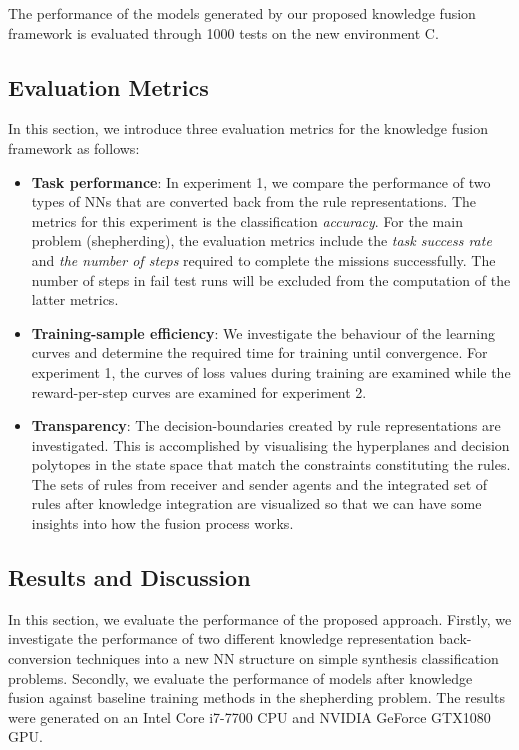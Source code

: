 \documentclass[lettersize,journal]{IEEEtran}
\begin{document}
The performance of the models generated by our proposed knowledge fusion framework is evaluated through 1000 tests on the new environment C.


\subsection{Evaluation Metrics}

In this section, we introduce three evaluation metrics for the knowledge fusion framework as follows:

\begin{itemize}
    \item \textbf{Task performance}: In experiment 1, we compare the performance of two types of NNs that are converted back from the rule representations. The metrics for this experiment is the classification \textit{accuracy}. For the main problem (shepherding), the evaluation metrics include the \textit{task success rate} and \textit{the number of steps} required to complete the missions successfully. The number of steps in fail test runs will be excluded from the computation of the latter metrics. 
    \item \textbf{Training-sample efficiency}: We investigate the behaviour of the learning curves and determine the required time for training until convergence. For experiment 1, the curves of loss values during training are examined while the reward-per-step curves are examined for experiment 2.
    \item \textbf{Transparency}: The decision-boundaries created by rule representations are investigated. This is accomplished by visualising the hyperplanes and decision polytopes in the state space that match the constraints constituting the rules. The sets of rules from receiver and sender agents and the integrated set of rules after knowledge integration are visualized so that we can have some insights into how the fusion process works.
\end{itemize}

\subsection{Results and Discussion}\label{jpaper2-results}

In this section, we evaluate the performance of the proposed approach. Firstly, we investigate the performance of two different knowledge representation back-conversion techniques into a new NN structure on simple synthesis classification problems. Secondly, we evaluate the performance of models after knowledge fusion against baseline training methods in the shepherding problem. The results were generated on an Intel Core i7-7700 CPU and NVIDIA GeForce GTX1080 GPU.
\end{document}
